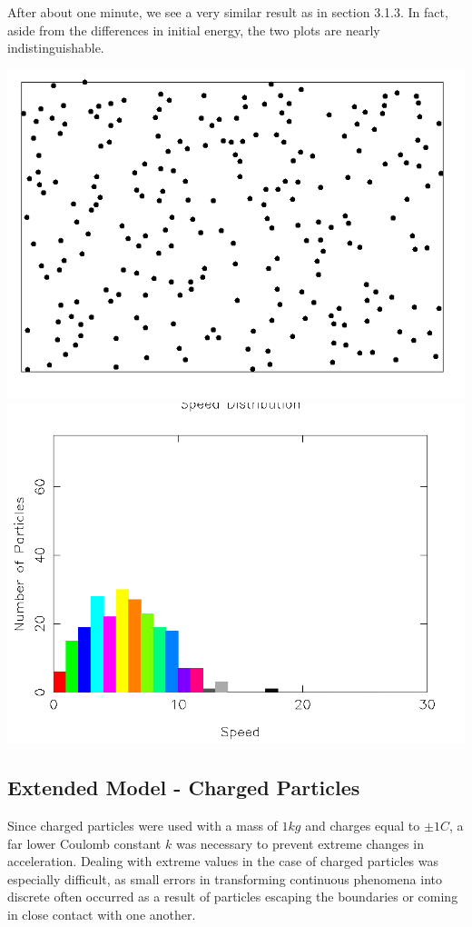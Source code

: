 \documentclass{article}
\begin{document}
After about one minute, we see a very similar result as in section 3.1.3. In fact, aside from the differences in initial energy,
the two plots are nearly indistinguishable.
\\
\begin{center}
    \includegraphics[scale=0.5]{uncharged_pool_2}
    \includegraphics[scale=0.5]{uncharged_pool_dist_2}
\end{center}

\subsection{Extended Model - Charged Particles}
Since charged particles were used with a mass of $1 kg$ and charges equal to $\pm 1 C$,
a far lower Coulomb constant $k$ was necessary to prevent extreme changes in acceleration.
Dealing with extreme values in the case of charged particles was especially difficult,
as small errors in transforming continuous phenomena into discrete often occurred as a result of
particles escaping the boundaries or coming in close contact with one another.
\end{document}
